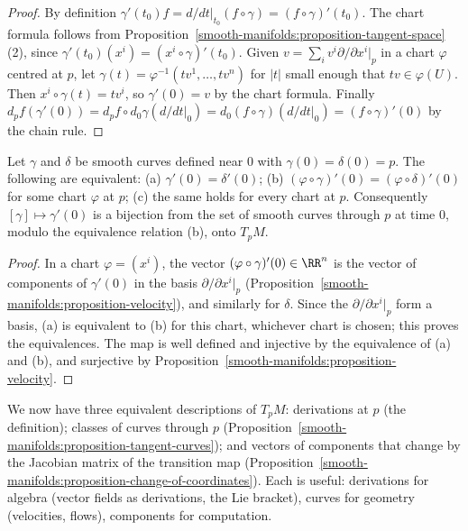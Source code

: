 \begin{proof}
By definition $\gamma'(t_0)f = d/dt|_{t_0}(f \circ \gamma) = (f \circ \gamma)'(t_0)$. The chart formula follows from
Proposition~\ref{smooth-manifolds:proposition-tangent-space}(2), since $\gamma'(t_0)(x^i) = (x^i \circ \gamma)'(t_0)$. Given
$v = \sum_iv^i\partial/\partial x^i|_p$ in a chart $\varphi$ centred at $p$, let $\gamma(t) = \varphi^{-1}(tv^1, \ldots, tv^n)$ for $|t|$ small enough that
$tv \in \varphi(U)$. Then $x^i \circ \gamma(t) = tv^i$, so $\gamma'(0) = v$ by the chart formula. Finally
$d_pf(\gamma'(0)) = d_pf \circ d_0\gamma(d/dt|_0) = d_0(f \circ \gamma)(d/dt|_0) = (f \circ \gamma)'(0)$ by the chain rule.
\end{proof}

\begin{proposition}\label{smooth-manifolds:proposition-tangent-curves}
Let $\gamma$ and $\delta$ be smooth curves defined near $0$ with $\gamma(0) = \delta(0) = p$. The following are equivalent: (a) $\gamma'(0) = \delta'(0)$;
(b) $(\varphi \circ \gamma)'(0) = (\varphi \circ \delta)'(0)$ for some chart $\varphi$ at $p$; (c) the same holds for every chart at $p$. Consequently
$[\gamma] \mapsto \gamma'(0)$ is a bijection from the set of smooth curves through $p$ at time $0$, modulo the equivalence relation (b), onto $T_pM$.
\end{proposition}

\begin{proof}
In a chart $\varphi = (x^i)$, the vector $(\varphi \circ \gamma)'(0) \in \RR^n$ is the vector of components of $\gamma'(0)$ in the basis
$\partial/\partial x^i|_p$ (Proposition~\ref{smooth-manifolds:proposition-velocity}), and similarly for $\delta$. Since the $\partial/\partial x^i|_p$ form a
basis, (a) is equivalent to (b) for this chart, whichever chart is chosen; this proves the equivalences. The map is well defined and injective by the
equivalence of (a) and (b), and surjective by Proposition~\ref{smooth-manifolds:proposition-velocity}.
\end{proof}

\begin{remark}\label{smooth-manifolds:remark-three-definitions}
We now have three equivalent descriptions of $T_pM$: derivations at $p$ (the definition); classes of curves through $p$
(Proposition~\ref{smooth-manifolds:proposition-tangent-curves}); and vectors of components that change by the Jacobian matrix of the transition map
(Proposition~\ref{smooth-manifolds:proposition-change-of-coordinates}). Each is useful: derivations for algebra (vector fields as derivations, the Lie
bracket), curves for geometry (velocities, flows), components for computation.
\end{remark}

